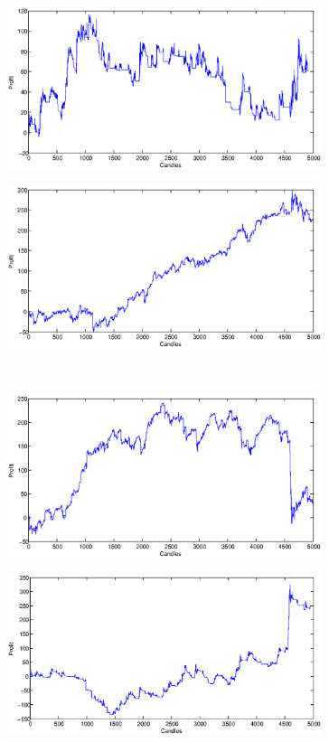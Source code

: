 \documentclass{tewiart}
\begin{document}
\begin{figure}[h]
\centering
\begin{minipage}{.49\linewidth}
\centering 
\includegraphics[width=0.82\textwidth]{images/S1a_gold.eps}
\label{jedno}
\end{minipage}
\begin{minipage}{.49\linewidth}
\centering 
\includegraphics[width=0.82\textwidth]{images/S1b_gold.eps}
\label{dwu}
\end{minipage}
\\
\begin{minipage}{.49\linewidth}
\centering 
\includegraphics[width=0.82\textwidth]{images/S1c_gold.eps}
\label{cztero}
\end{minipage}
\begin{minipage}{.49\linewidth}
\centering 
\includegraphics[width=0.82\textwidth]{images/S1d_gold.eps}

\end{minipage}
\end{figure}
\end{document}
